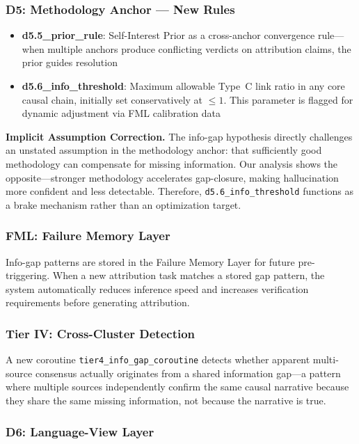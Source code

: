 \subsubsection{D5: Methodology Anchor --- New Rules}

\begin{itemize}
  \item \textbf{d5.5\_prior\_rule}: Self-Interest Prior as a cross-anchor 
        convergence rule---when multiple anchors produce conflicting verdicts 
        on attribution claims, the prior guides resolution
  \item \textbf{d5.6\_info\_threshold}: Maximum allowable Type~C link ratio in 
        any core causal chain, initially set conservatively at $\leq 1$. This 
        parameter is flagged for dynamic adjustment via FML calibration data
\end{itemize}

\textbf{Implicit Assumption Correction.} The info-gap hypothesis directly 
challenges an unstated assumption in the methodology anchor: that sufficiently 
good methodology can compensate for missing information. Our analysis shows the 
opposite---stronger methodology accelerates gap-closure, making hallucination 
more confident and less detectable. Therefore, \texttt{d5.6\_info\_threshold} 
functions as a brake mechanism rather than an optimization target.

\subsubsection{FML: Failure Memory Layer}

Info-gap patterns are stored in the Failure Memory Layer for future 
pre-triggering. When a new attribution task matches a stored gap pattern, the 
system automatically reduces inference speed and increases verification 
requirements before generating attribution.

\subsubsection{Tier IV: Cross-Cluster Detection}

A new coroutine \texttt{tier4\_info\_gap\_coroutine} detects whether apparent 
multi-source consensus actually originates from a shared information gap---a 
pattern where multiple sources independently confirm the same causal narrative 
because they share the same missing information, not because the narrative is 
true.

\subsubsection{D6: Language-View Layer}

